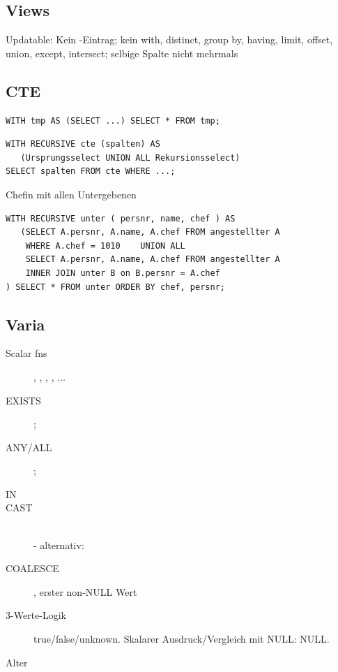 \begin{multicols*}{3}
\subsection{Views}

Updatable: Kein -Eintrag; kein with, distinct, group by, having,
limit, offset, union, except, intersect; selbige Spalte nicht mehrmals

\subsection{CTE}
\begin{verbatim}
WITH tmp AS (SELECT ...) SELECT * FROM tmp;
\end{verbatim}

\begin{verbatim}
WITH RECURSIVE cte (spalten) AS
   (Ursprungsselect UNION ALL Rekursionsselect)
SELECT spalten FROM cte WHERE ...;
\end{verbatim}

Chefin mit allen Untergebenen
\begin{verbatim}
WITH RECURSIVE unter ( persnr, name, chef ) AS
   (SELECT A.persnr, A.name, A.chef FROM angestellter A
    WHERE A.chef = 1010    UNION ALL
    SELECT A.persnr, A.name, A.chef FROM angestellter A
    INNER JOIN unter B on B.persnr = A.chef
) SELECT * FROM unter ORDER BY chef, persnr;
\end{verbatim}

\subsection{Varia}

\begin{description}
\item[Scalar fns]{, , , , $\ldots$}
\item[EXISTS]{;}
\item[ANY/ALL]{;}
\item[IN]{}
\item[CAST]{ \\  - alternativ: }
\item[COALESCE]{, erster non-NULL Wert}
\item[3-Werte-Logik]{true/false/unknown. Skalarer Ausdruck/Vergleich mit NULL: NULL.}
\item[Alter]{}
\end{description}


\end{multicols*}
